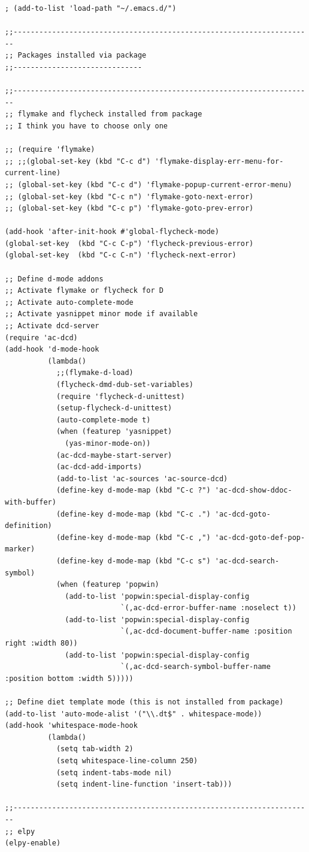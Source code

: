 \documentclass[12pt,spanish,]{scrartcl}
\begin{document}
\begin{verbatim}
; (add-to-list 'load-path "~/.emacs.d/")

;;----------------------------------------------------------------------
;; Packages installed via package
;;------------------------------

;;----------------------------------------------------------------------
;; flymake and flycheck installed from package
;; I think you have to choose only one

;; (require 'flymake)
;; ;;(global-set-key (kbd "C-c d") 'flymake-display-err-menu-for-current-line)
;; (global-set-key (kbd "C-c d") 'flymake-popup-current-error-menu)
;; (global-set-key (kbd "C-c n") 'flymake-goto-next-error)
;; (global-set-key (kbd "C-c p") 'flymake-goto-prev-error)

(add-hook 'after-init-hook #'global-flycheck-mode)
(global-set-key  (kbd "C-c C-p") 'flycheck-previous-error)
(global-set-key  (kbd "C-c C-n") 'flycheck-next-error)

;; Define d-mode addons
;; Activate flymake or flycheck for D
;; Activate auto-complete-mode
;; Activate yasnippet minor mode if available
;; Activate dcd-server
(require 'ac-dcd)
(add-hook 'd-mode-hook
          (lambda()
            ;;(flymake-d-load)
            (flycheck-dmd-dub-set-variables)
            (require 'flycheck-d-unittest)
            (setup-flycheck-d-unittest)
            (auto-complete-mode t)
            (when (featurep 'yasnippet)
              (yas-minor-mode-on))
            (ac-dcd-maybe-start-server)
            (ac-dcd-add-imports)
            (add-to-list 'ac-sources 'ac-source-dcd)
            (define-key d-mode-map (kbd "C-c ?") 'ac-dcd-show-ddoc-with-buffer)
            (define-key d-mode-map (kbd "C-c .") 'ac-dcd-goto-definition)
            (define-key d-mode-map (kbd "C-c ,") 'ac-dcd-goto-def-pop-marker)
            (define-key d-mode-map (kbd "C-c s") 'ac-dcd-search-symbol)
            (when (featurep 'popwin)
              (add-to-list 'popwin:special-display-config
                           `(,ac-dcd-error-buffer-name :noselect t))
              (add-to-list 'popwin:special-display-config
                           `(,ac-dcd-document-buffer-name :position right :width 80))
              (add-to-list 'popwin:special-display-config
                           `(,ac-dcd-search-symbol-buffer-name :position bottom :width 5)))))

;; Define diet template mode (this is not installed from package)
(add-to-list 'auto-mode-alist '("\\.dt$" . whitespace-mode))
(add-hook 'whitespace-mode-hook
          (lambda()
            (setq tab-width 2)
            (setq whitespace-line-column 250)
            (setq indent-tabs-mode nil)
            (setq indent-line-function 'insert-tab)))

;;----------------------------------------------------------------------
;; elpy
(elpy-enable)
\end{verbatim}
\end{document}
